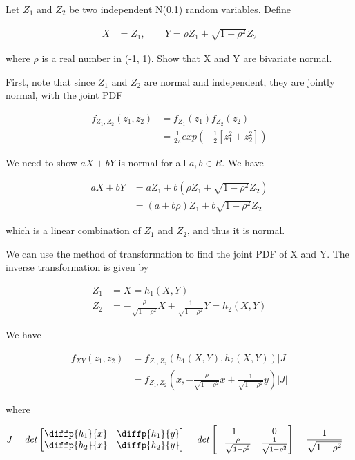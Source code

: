 Let $Z_1$ and $Z_2$ be two independent N(0,1) random variables. Define

\begin{align*}
	X &= Z_1, \qquad Y= \rho Z_1 + \sqrt{1-\rho^2} Z_2
\end{align*}

where $\rho$ is a real number in (-1, 1). Show that X and Y are bivariate normal.

First, note that since $Z_1$ and $Z_2$ are normal and independent, they are jointly normal, with the joint PDF

\begin{align*}
	f_{Z_1, Z_2} (z_1, z_2) &= f_{Z_1}(z_1) f_{Z_2}(z_2) \\
	&= \frac{1}{2 \pi} exp \left(-\frac{1}{2} [z_1^2 + z_2^2] \right)
\end{align*}

We need to show $aX+bY$ is normal for all $a,b \in R$. We have

\begin{align*}
	aX + bY &= a Z_1 + b(\rho Z_1 + \sqrt{1- \rho^2} Z_2) \\
	&= (a + b\rho) Z_1 + b \sqrt{1- \rho^2} Z_2
\end{align*}

which is a linear combination of $Z_1$ and $Z_2$, and thus it is normal.


We can use the method of transformation to find the joint PDF of X and Y. The inverse transformation is given by

\begin{align*}
	Z_1 &= X = h_1(X, Y) \\
	Z_2 &= -\frac{\rho}{\sqrt{1-\rho^2}} X + \frac{1}{\sqrt{1-\rho^2}} Y = h_2(X, Y)
\end{align*}

We have

\begin{align*}
	f_{XY}(z_1, z_2) &= f_{Z_1, Z_2} (h_1(X, Y), h_2(X, Y)) |J|\\
	&= f_{Z_1, Z_2} (x, -\frac{\rho}{\sqrt{1-\rho^2}} x + \frac{1}{\sqrt{1-\rho^2}} y) |J|
\end{align*}

where 

\begin{align*}
	J &= det \begin{bmatrix}
		\diffp{h_1}{x} & \diffp{h_1}{y} \\
		\diffp{h_2}{x} & \diffp{h_2}{y}
	\end{bmatrix} = det \begin{bmatrix}
	1 & 0 \\
	-\frac{\rho}{\sqrt{1-\rho^2}} & \frac{1}{\sqrt{1-\rho^2}}
\end{bmatrix} = \frac{1}{\sqrt{1-\rho^2}}
\end{align*}

